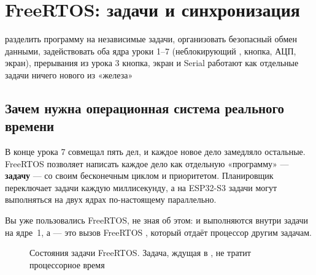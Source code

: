 \section{FreeRTOS: задачи и синхронизация}\label{les:rtos}
\lessonintro
  {разделить программу на независимые задачи, организовать безопасный обмен данными, задействовать оба ядра}
  {уроки 1--7 (неблокирующий , кнопка, АЦП, экран), прерывания из урока 3}
  {кнопка, экран и Serial работают как отдельные задачи}
  {ничего нового из «железа»}

\subsection{Зачем нужна операционная система реального времени}

В конце урока 7  совмещал пять дел, и каждое новое дело замедляло остальные.
FreeRTOS позволяет написать каждое дело как отдельную «программу» --- \textbf{задачу} --- со своим
бесконечным циклом и приоритетом. Планировщик переключает задачи каждую миллисекунду, а на
ESP32-S3 задачи могут выполняться на двух ядрах по-настоящему параллельно.

Вы уже пользовались FreeRTOS, не зная об этом:  и  выполняются внутри
задачи  на ядре~1, а  --- это вызов FreeRTOS , который
отдаёт процессор другим задачам.

\begin{figure}[H]
\centering
{}
\caption{Состояния задачи FreeRTOS. Задача, ждущая в , не тратит процессорное время}
\end{figure}

